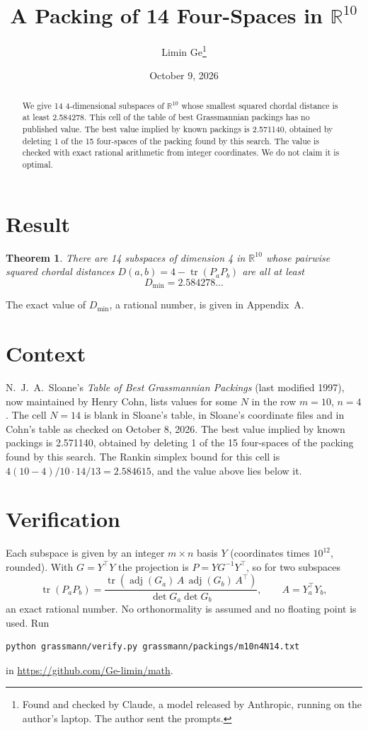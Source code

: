 \documentclass[11pt,a4paper]{article}
\title{A Packing of 14 Four-Spaces in $\mathbb{R}^{10}$}
\author{Limin Ge\thanks{Found and checked by Claude, a model released by Anthropic, running on the author's laptop. The author sent the prompts.}}
\date{October 9, 2026}
\newtheorem*{theorem}{Theorem}
\begin{document}
\maketitle
\begin{abstract}
We give 14 4-dimensional subspaces of $\mathbb{R}^{10}$ whose smallest squared chordal distance is at least 2.584278. This cell of the table of best Grassmannian packings has no published value. The best value implied by known packings is 2.571140, obtained by deleting 1 of the 15 four-spaces of the packing found by this search. The value is checked with exact rational arithmetic from integer coordinates. We do not claim it is optimal.
\end{abstract}

\section{Result}
\begin{theorem}
There are 14 subspaces of dimension 4 in $\mathbb{R}^{10}$ whose pairwise squared chordal distances $D(a,b) = 4 - \operatorname{tr}(P_aP_b)$ are all at least
\[ D_{\min} = 2.584278\ldots \]
\end{theorem}
The exact value of $D_{\min}$, a rational number, is given in Appendix~A.


\section{Context}
N.~J.~A.~Sloane's \emph{Table of Best Grassmannian Packings} (last modified 1997), now maintained by Henry Cohn, lists values for some $N$ in the row $m=10$, $n=4$. The cell $N=14$ is blank in Sloane's table, in Sloane's coordinate files and in Cohn's table as checked on October 8, 2026. The best value implied by known packings is 2.571140, obtained by deleting 1 of the 15 four-spaces of the packing found by this search. The Rankin simplex bound for this cell is $4(10-4)/10\cdot 14/13 = 2.584615$, and the value above lies below it.


\section{Verification}
Each subspace is given by an integer $m\times n$ basis $Y$ (coordinates times $10^{12}$, rounded). With $G=Y^\top Y$ the projection is $P=YG^{-1}Y^\top$, so for two subspaces
\[ \operatorname{tr}(P_aP_b)=\frac{\operatorname{tr}(\operatorname{adj}(G_a)\,A\,\operatorname{adj}(G_b)\,A^\top)}{\det G_a\det G_b},\qquad A=Y_a^\top Y_b, \]
an exact rational number. No orthonormality is assumed and no floating point is used. Run
\begin{verbatim}
python grassmann/verify.py grassmann/packings/m10n4N14.txt
\end{verbatim}
in \url{https://github.com/Ge-limin/math}.
\end{document}
